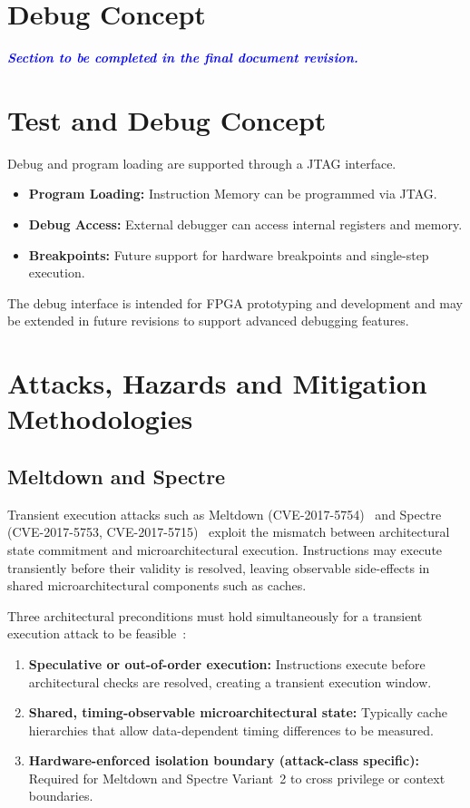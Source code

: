 \section{Debug Concept}

\textcolor{blue}{\textbf{\textit{Section to be completed in the final document revision.}}}

\section{Test and Debug Concept}

Debug and program loading are supported through a JTAG interface.

\begin{itemize}
    \item \textbf{Program Loading:}
          Instruction Memory can be programmed via JTAG.
    \item \textbf{Debug Access:}
          External debugger can access internal registers and memory.
    \item \textbf{Breakpoints:}
          Future support for hardware breakpoints and single-step execution.
\end{itemize}

The debug interface is intended for FPGA prototyping and development and may
be extended in future revisions to support advanced debugging features.


\section{Attacks, Hazards and Mitigation Methodologies}
\label{sec:arch_hazards}

\subsection{Meltdown and Spectre}
\label{sec:arch_meltdown_spectre}

Transient execution attacks such as Meltdown (CVE-2017-5754)~\cite{lipp2018meltdown}
and Spectre (CVE-2017-5753, CVE-2017-5715)~\cite{kocher2019spectre} exploit the
mismatch between architectural state commitment and microarchitectural execution.
Instructions may execute transiently before their validity is resolved, leaving
observable side-effects in shared microarchitectural components such as caches.

Three architectural preconditions must hold simultaneously for a transient
execution attack to be feasible~\cite{kocher2019spectre,intel2018analysis}:
\begin{enumerate}
  \item \textbf{Speculative or out-of-order execution:} Instructions execute before
        architectural checks are resolved, creating a transient execution window.
  \item \textbf{Shared, timing-observable microarchitectural state:} Typically cache
        hierarchies that allow data-dependent timing differences to be measured.
  \item \textbf{Hardware-enforced isolation boundary (attack-class specific):}
        Required for Meltdown and Spectre Variant~2 to cross privilege or context boundaries.
\end{enumerate}

